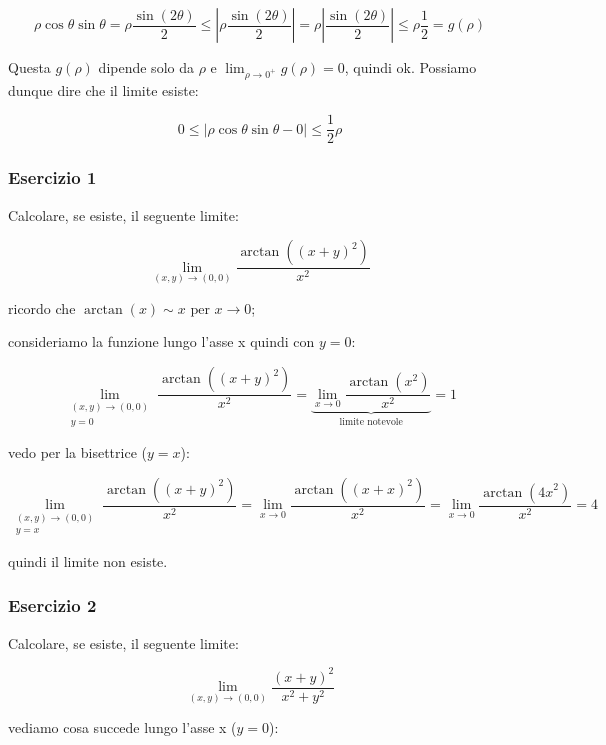 \[
    \rho\cos\theta\sin\theta = \rho\frac{\sin(2\theta)}{2} \le \left|\rho\frac{\sin(2\theta)}{2}\right| = \rho\left|\frac{\sin(2\theta)}{2}\right| \le \rho{\frac{1}{2}} = g(\rho)
\]

Questa \(g(\rho)\) dipende solo da \(\rho \) e \(\lim_{\rho \to 0^+} g(\rho) = 0\), quindi ok. Possiamo dunque dire che il limite esiste:

\[
    0 \le \left| \rho\cos\theta \sin\theta  -0 \right| \le \frac{1}{2}\rho
\]

\filbreak{}
\subsubsection*{Esercizio 1}

Calcolare, se esiste, il seguente limite:

\[
    \lim_{ (x,y) \to (0,0) } \frac{\arctan\left({(x+y)}^{2}\right)}{x^{2}}
\]

ricordo che \(\arctan(x) \sim x \text{ per } x\to0\);

consideriamo la funzione lungo l'asse x quindi con \(y=0\):

\[
    \lim_{ \begin{smallmatrix}(x,y) \to (0,0) \\ y=0\end{smallmatrix} } \frac{\arctan\left({(x+y)}^{2}\right)}{x^{2}}= \underbrace{\lim_{ x \to 0 } \frac{\arctan\left(x^{2}\right) }{x^{2}}}_{\text{limite notevole}} = 1
\]

vedo per la bisettrice (\(y=x\)):

\[
    \lim_{ \begin{smallmatrix}(x,y) \to (0,0) \\ y=x\end{smallmatrix} } \frac{\arctan\left({(x+y)}^{2}\right)}{x^{2}} = \lim_{ x \to 0 } \frac{\arctan\left({(x+x)}^{2}\right)}{x^{2}} = \lim_{ x \to 0 } \frac{\arctan\left({4x}^{2}\right)}{x^{2}} = 4
\]

quindi il limite non esiste.

\filbreak{}
\subsubsection*{Esercizio 2}

Calcolare, se esiste, il seguente limite:

\[
    \lim_{ (x,y) \to (0,0) } \frac{{(x+y)}^{2}}{x^{2}+y^{2}}
\]

vediamo cosa succede lungo l'asse x (\(y=0\)):

